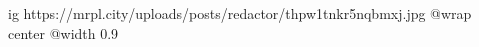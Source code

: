  
 
 
 
 

\ifcmt
  ig https://mrpl.city/uploads/posts/redactor/thpw1tnkr5nqbmxj.jpg
  @wrap center
  @width 0.9
\fi

